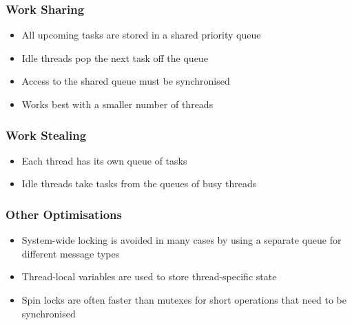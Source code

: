 \documentclass{beamer}
\begin{document}
	\begin{frame}
		\frametitle{Work Sharing}

		\begin{itemize}
			\item All upcoming tasks are stored in a shared priority queue
			\item Idle threads pop the next task off the queue
			\item Access to the shared queue must be synchronised
			\item Works best with a smaller number of threads
		\end{itemize}
	\end{frame}

	\begin{frame}
		\frametitle{Work Stealing}

		\begin{itemize}
			\item Each thread has its own queue of tasks
			\item Idle threads take tasks from the queues of busy threads
		\end{itemize}
	\end{frame}

	\begin{frame}
		\frametitle{Other Optimisations}

		\begin{itemize}
			\item System-wide locking is avoided in many cases by using a separate queue for different message types
			\item Thread-local variables are used to store thread-specific state
			\item Spin locks are often faster than mutexes for short operations that need to be synchronised
		\end{itemize}
	\end{frame}

\end{document}
